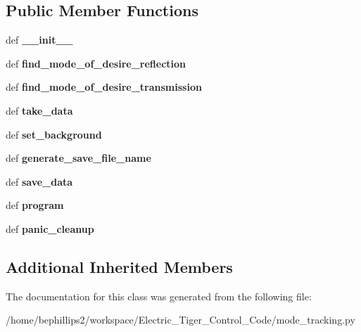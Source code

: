 \subsection*{Public Member Functions}
\begin{DoxyCompactItemize}
\item 
\hypertarget{classmode__tracking_1_1_mode_track_program_afbf19a48de99b186ea59ba6fd0fa78c5}{def {\bfseries \-\_\-\-\_\-init\-\_\-\-\_\-}}\label{classmode__tracking_1_1_mode_track_program_afbf19a48de99b186ea59ba6fd0fa78c5}

\item 
\hypertarget{classmode__tracking_1_1_mode_track_program_a744015ceeefc004994908aa32cdc386e}{def {\bfseries find\-\_\-mode\-\_\-of\-\_\-desire\-\_\-reflection}}\label{classmode__tracking_1_1_mode_track_program_a744015ceeefc004994908aa32cdc386e}

\item 
\hypertarget{classmode__tracking_1_1_mode_track_program_ae35b080e6d60c56efad0719df887350c}{def {\bfseries find\-\_\-mode\-\_\-of\-\_\-desire\-\_\-transmission}}\label{classmode__tracking_1_1_mode_track_program_ae35b080e6d60c56efad0719df887350c}

\item 
\hypertarget{classmode__tracking_1_1_mode_track_program_ae4e01df4f05f30a04bfd58d8e740302e}{def {\bfseries take\-\_\-data}}\label{classmode__tracking_1_1_mode_track_program_ae4e01df4f05f30a04bfd58d8e740302e}

\item 
\hypertarget{classmode__tracking_1_1_mode_track_program_a40c65500c8890855a284cc5aeacc2f0b}{def {\bfseries set\-\_\-background}}\label{classmode__tracking_1_1_mode_track_program_a40c65500c8890855a284cc5aeacc2f0b}

\item 
\hypertarget{classmode__tracking_1_1_mode_track_program_af4cb7b240fadd3e13d72de657471203c}{def {\bfseries generate\-\_\-save\-\_\-file\-\_\-name}}\label{classmode__tracking_1_1_mode_track_program_af4cb7b240fadd3e13d72de657471203c}

\item 
\hypertarget{classmode__tracking_1_1_mode_track_program_a90da8800bc7d030f948911aef9d599c0}{def {\bfseries save\-\_\-data}}\label{classmode__tracking_1_1_mode_track_program_a90da8800bc7d030f948911aef9d599c0}

\item 
\hypertarget{classmode__tracking_1_1_mode_track_program_a2c561b201beccdd18632a0b2d0eabe72}{def {\bfseries program}}\label{classmode__tracking_1_1_mode_track_program_a2c561b201beccdd18632a0b2d0eabe72}

\item 
\hypertarget{classmode__tracking_1_1_mode_track_program_a69a58d0fdac58bc08495a9d41c5fb80d}{def {\bfseries panic\-\_\-cleanup}}\label{classmode__tracking_1_1_mode_track_program_a69a58d0fdac58bc08495a9d41c5fb80d}

\end{DoxyCompactItemize}
\subsection*{Additional Inherited Members}


The documentation for this class was generated from the following file\-:\begin{DoxyCompactItemize}
\item 
/home/bephillips2/workspace/\-Electric\-\_\-\-Tiger\-\_\-\-Control\-\_\-\-Code/mode\-\_\-tracking.\-py\end{DoxyCompactItemize}
